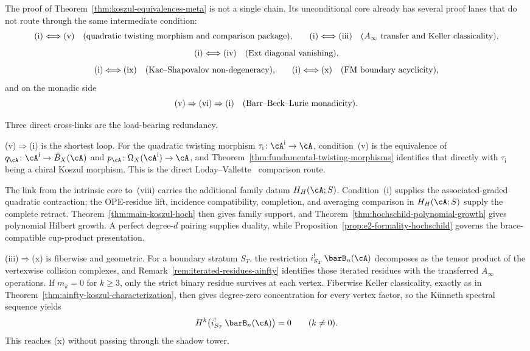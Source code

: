 \begin{remark}
\label{rem:koszul-proof-web-redundancy}
The proof of Theorem~\ref{thm:koszul-equivalences-meta} is not a
single chain.
Its unconditional core already has several proof lanes that do not
route through the same intermediate condition:
\[
\textup{(i)} \Longleftrightarrow \textup{(v)}
\quad\text{(quadratic twisting morphism and comparison package),}\qquad
\textup{(i)} \Longleftrightarrow \textup{(iii)}
\quad\text{($A_\infty$ transfer and Keller classicality),}
\]
\[
\textup{(i)} \Longleftrightarrow \textup{(iv)}
\quad\text{(Ext diagonal vanishing),}
\]
\[
\textup{(i)} \Longleftrightarrow \textup{(ix)}
\quad\text{(Kac--Shapovalov non-degeneracy),}\qquad
\textup{(i)} \Longleftrightarrow \textup{(x)}
\quad\text{(FM boundary acyclicity),}
\]
and on the monadic side
\[
\textup{(v)} \Rightarrow \textup{(vi)} \Rightarrow \textup{(i)}
\quad\text{(Barr--Beck--Lurie monadicity).}
\]

Three direct cross-links are the load-bearing redundancy.

\smallskip\noindent
\textup{(v)}$\Rightarrow$\textup{(i)} is the shortest loop.
For the quadratic twisting morphism
$\tau_{\mathrm i}\colon\cA^{\mathrm i}\to\cA$,
condition~\textup{(v)} is the equivalence of
$q_\cA\colon\cA^{\mathrm i}\to\bar B_X(\cA)$ and
$p_\cA\colon\Omega_X(\cA^{\mathrm i})\to\cA$, and
Theorem~\ref{thm:fundamental-twisting-morphisms}
identifies that directly with
$\tau_{\mathrm i}$ being a chiral Koszul morphism.  This is the direct
Loday--Vallette~\cite[Theorem~2.3.2 and Theorem~3.4.6]{LV12}
comparison route.

\smallskip\noindent
The link from the intrinsic core to~\textup{(viii)} carries the
additional family datum $H_H(\cA;S)$.  Condition~\textup{(i)} supplies
the associated-graded quadratic contraction; the OPE-residue lift,
incidence compatibility, completion, and averaging comparison in
$H_H(\cA;S)$ supply the complete retract.  Theorem~\ref{thm:main-koszul-hoch}
then gives family support, and
Theorem~\ref{thm:hochschild-polynomial-growth} gives polynomial
Hilbert growth.  A perfect degree-$d$ pairing supplies duality, while
Proposition~\ref{prop:e2-formality-hochschild} governs the
brace-compatible cup-product presentation.

\smallskip\noindent
\textup{(iii)}$\Rightarrow$\textup{(x)} is fiberwise and geometric.
For a boundary stratum $S_T$, the restriction
$i_{S_T}^!\,\barB_n(\cA)$ decomposes as the tensor product of the
vertexwise collision complexes, and
Remark~\ref{rem:iterated-residues-ainfty}
identifies those iterated residues with the transferred
$A_\infty$ operations.
If $m_k = 0$ for $k \geq 3$, only the strict binary residue survives
at each vertex.
Fiberwise Keller classicality, exactly as in
Theorem~\ref{thm:ainfty-koszul-characterization},
then gives degree-zero concentration for every vertex factor, so
the K\"unneth spectral sequence yields
\[
H^k\bigl(i_{S_T}^!\,\barB_n(\cA)\bigr)=0
\qquad (k \neq 0).
\]
This reaches \textup{(x)} without passing through the shadow tower.


\end{remark}
